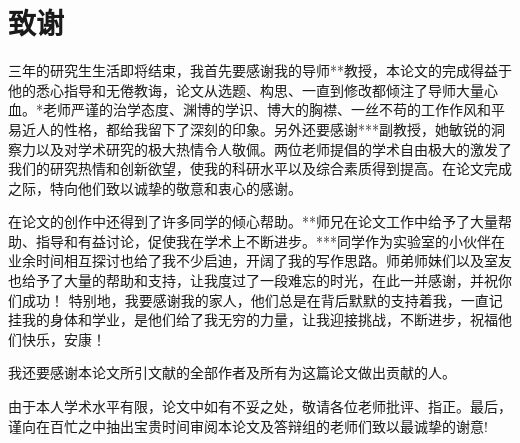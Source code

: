 \chapter*{致\quad 谢}


三年的研究生生活即将结束，我首先要感谢我的导师**教授，本论文的完成得益于他的悉心指导和无倦教诲，论文从选题、构思、一直到修改都倾注了导师大量心血。*老师严谨的治学态度、渊博的学识、博大的胸襟、一丝不苟的工作作风和平易近人的性格，都给我留下了深刻的印象。另外还要感谢***副教授，她敏锐的洞察力以及对学术研究的极大热情令人敬佩。两位老师提倡的学术自由极大的激发了我们的研究热情和创新欲望，使我的科研水平以及综合素质得到提高。在论文完成之际，特向他们致以诚挚的敬意和衷心的感谢。

在论文的创作中还得到了许多同学的倾心帮助。**师兄在论文工作中给予了大量帮助、指导和有益讨论，促使我在学术上不断进步。***同学作为实验室的小伙伴在业余时间相互探讨也给了我不少启迪，开阔了我的写作思路。师弟师妹们以及室友也给予了大量的帮助和支持，让我度过了一段难忘的时光，在此一并感谢，并祝你们成功！ 
特别地，我要感谢我的家人，他们总是在背后默默的支持着我，一直记挂我的身体和学业，是他们给了我无穷的力量，让我迎接挑战，不断进步，祝福他们快乐，安康！ 

我还要感谢本论文所引文献的全部作者及所有为这篇论文做出贡献的人。

由于本人学术水平有限，论文中如有不妥之处，敬请各位老师批评、指正。最后，谨向在百忙之中抽出宝贵时间审阅本论文及答辩组的老师们致以最诚挚的谢意!

